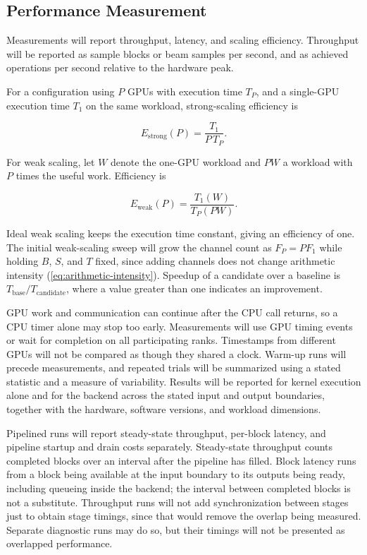 \subsection{Performance Measurement}
\label{sec:performance-measurement}

Measurements will report throughput, latency, and scaling efficiency. Throughput will be reported as sample blocks or beam samples per second, and as achieved operations per second relative to the hardware peak.

For a configuration using $P$ GPUs with execution time $T_P$, and a single-GPU execution time $T_1$ on the same workload, strong-scaling efficiency is

\[
  E_{\mathrm{strong}}(P) = \frac{T_1}{P\,T_P}.
\]

For weak scaling, let $W$ denote the one-GPU workload and $PW$ a workload with $P$ times the useful work. Efficiency is

\[
  E_{\mathrm{weak}}(P) = \frac{T_1(W)}{T_P(PW)}.
\]

Ideal weak scaling keeps the execution time constant, giving an efficiency of one. The initial weak-scaling sweep will grow the channel count as $F_P = P F_1$ while holding $B$, $S$, and $T$ fixed, since adding channels does not change arithmetic intensity (\cref{eq:arithmetic-intensity}). Speedup of a candidate over a baseline is $T_{\mathrm{base}}/T_{\mathrm{candidate}}$, where a value greater than one indicates an improvement.

GPU work and communication can continue after the CPU call returns, so a CPU timer alone may stop too early. Measurements will use GPU timing events or wait for completion on all participating ranks. Timestamps from different GPUs will not be compared as though they shared a clock. Warm-up runs will precede measurements, and repeated trials will be summarized using a stated statistic and a measure of variability. Results will be reported for kernel execution alone and for the backend across the stated input and output boundaries, together with the hardware, software versions, and workload dimensions.

Pipelined runs will report steady-state throughput, per-block latency, and pipeline startup and drain costs separately. Steady-state throughput counts completed blocks over an interval after the pipeline has filled. Block latency runs from a block being available at the input boundary to its outputs being ready, including queueing inside the backend; the interval between completed blocks is not a substitute. Throughput runs will not add synchronization between stages just to obtain stage timings, since that would remove the overlap being measured. Separate diagnostic runs may do so, but their timings will not be presented as overlapped performance.

